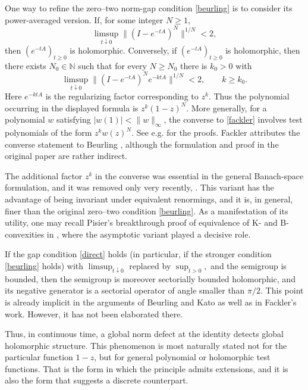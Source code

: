 \documentclass[11pt]{amsart}
\numberwithin{equation}{section}
\theoremstyle{definition}
\theoremstyle{plain}
\begin{document}
 One way to refine the zero--two norm-gap condition \eqref{beurling} is to consider
its power-averaged version.
 If, for some integer
\(N\geq 1\),
\begin{equation}\label{direct}
        \limsup_{t\downarrow 0}
        \bigl\|(I-e^{-tA})^N\bigr\|^{1/N}<2,
\end{equation}
then \((e^{-tA})_{t\geq 0}\) is holomorphic.
Conversely, if \((e^{-tA})_{t\geq 0}\) is holomorphic, then there exists
\(N_0\in\mathbb N\) such that for every \(N\geq N_0\) there is
\(k_0>0\) with
\begin{equation}\label{converse}
        \limsup_{t\downarrow 0}
        \bigl\|(I-e^{-tA})^N e^{-ktA}\bigr\|^{1/N}<2,
        \qquad k\geq k_0.
\end{equation}
Here \(e^{-ktA}\) is the regularizing factor corresponding to
\(z^k\). Thus the polynomial occurring in the displayed formula is
\(z^k(1-z)^N\).  More generally, for a polynomial \(w\) satisfying
\(|w(1)|<\|w\|_\infty\), the converse to \eqref{fackler} involves test polynomials
of the form \(z^kw(z)^N\).
See e.g. \cite[Theorems 2.2 and 5.4]{Fackler} for the proofs.
Fackler attributes the converse statement to Beurling \cite{Beurling},
although the formulation and proof in the original paper are rather indirect.


The additional factor \(z^k\) in the converse was essential in the
general Banach-space formulation, and it was removed only very recently,
\cite{Borichev1}.
This variant has the advantage of being invariant under equivalent
renormings, and it is, in general, finer than the original zero--two
condition \eqref{beurling}.
As a manifestation of its utility, one may recall Pisier's breakthrough proof of equivalence of K- and B-convexities in \cite{Pisier},
where the asymptotic variant played a decisive role.

If the gap condition \eqref{direct} holds (in particular, if the
stronger condition \eqref{beurling} holds) 
with $\limsup_{t \downarrow 0}$ replaced by $\sup_{t>0},$
and the semigroup is bounded,
 then the semigroup is
moreover sectorially bounded holomorphic, and its negative generator is a
sectorial operator of angle smaller than $\pi/2$. This point is already implicit in the arguments of
Beurling and Kato as well as in  Fackler's work.
However, it has not been elaborated there.

Thus,
in continuous time, a global norm defect at the identity detects global holomorphic
structure. This phenomenon is most naturally stated not for the particular
function $1-z$, but for general polynomial or holomorphic test functions. That
is the form in which the principle admits extensions, and it is also the form
that suggests a discrete counterpart.
\end{document}
